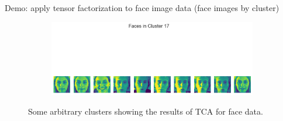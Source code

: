 \documentclass[xcolor={dvipsnames,svgnames}]{beamer}
\begin{document}
\begin{frame}{Demo: apply tensor factorization to face image data (face images by cluster)}
\begin{figure}[H]
\begin{subfigure}[b]{0.45\textwidth}
            \end{subfigure}
            \hfill
            \begin{subfigure}[b]{0.45\textwidth}
                \includegraphics[width=\textwidth]{figures-face-results/face17.png}
            \end{subfigure}
            \caption{Some arbitrary clusters showing the results of TCA for face data.}
            \end{figure} 
\end{frame}
\end{document}
